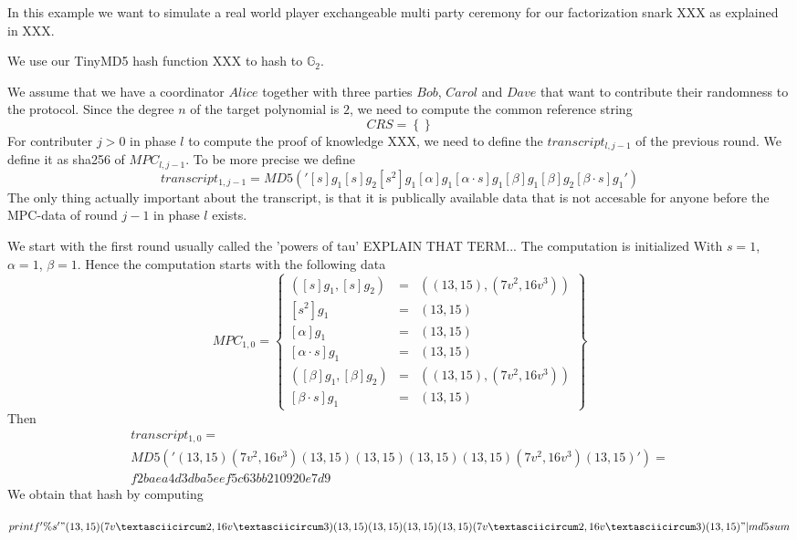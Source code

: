 \begin{example} In this example we want to simulate a real world player exchangeable multi party ceremony for our factorization snark XXX as explained in XXX.

We use our TinyMD5 hash function XXX to hash to $\mathbb{G}_2$.


We assume that we have a coordinator $Alice$ together with three parties $Bob$, $Carol$ and $Dave$ that want to contribute their randomness to the protocol. Since the degree $n$ of the target polynomial is $2$, we need to compute the common reference string
$$
CRS= \left\{\right\}
$$
For contributer $j>0$ in phase $l$ to compute the proof of knowledge XXX, we need to define the $transcript_{l,j-1}$ of the previous round. We define it as sha256 of $MPC_{l,j-1}$. To be more precise we define
$$
transcript_{1,j-1}= 
MD5(
'[s]g_1 [s]g_2 [s^2] g_1 [\alpha]g_1 [\alpha\cdot s]g_1
[\beta]g_1 [\beta]g_2[\beta \cdot s]g_1'
)
$$
The only thing actually important about the transcript, is that it is publically available data that is not accesable for anyone before the MPC-data of round $j-1$ in phase $l$ exists.

We start with the first round usually called the 'powers of tau' EXPLAIN THAT TERM...
The computation is initialized With $s=1$, $\alpha=1$, $\beta=1$. Hence the computation starts with the following data
$$
MPC_{1,0}= \left\{
\begin{array}{lcl}
([s]g_1, [s]g_2) &=& ((13,15),(7v^2,16v^3))\\ 
{}[s^2] g_1 &=& (13,15)\\
{}[\alpha]g_1 &=& (13,15)\\ 
{}[\alpha\cdot s]g_1 &=& (13,15)\\ 
([\beta]g_1,[\beta]g_2) &=& ((13,15),(7v^2,16v^3))\\ 
{}[\beta \cdot s]g_1 &=& (13,15)
\end{array}
\right\}
$$
Then 
\begin{multline*}
transcript_{1,0}=\\ 
MD5('(13,15)(7v^2,16v^3)(13,15)(13,15)(13,15)(13,15)(7v^2,16v^3)(13,15)') =\\ f2baea4d3dba5eef5c63bb210920e7d9
\end{multline*}
We obtain that hash by computing

$printf '\%s' "(13,15)(7v\textasciicircum 2,16v\textasciicircum 3)(13,15)(13,15)(13,15)(13,15)(7v\textasciicircum 2,16v\textasciicircum 3)(13,15)" | md5sum$


\end{example}
